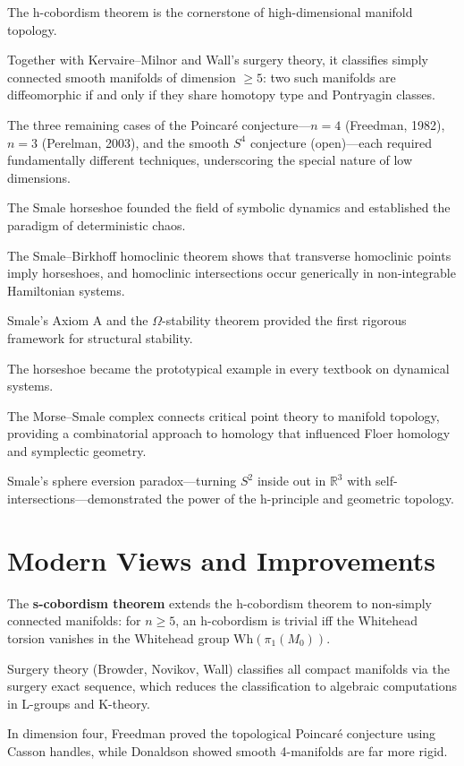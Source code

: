 The h-cobordism theorem is the cornerstone of high-dimensional manifold topology.

Together with Kervaire--Milnor and Wall's surgery theory, it classifies simply connected smooth manifolds of dimension $\geq 5$: two such manifolds are diffeomorphic if and only if they share homotopy type and Pontryagin classes.

The three remaining cases of the Poincaré conjecture---$n = 4$ (Freedman, 1982), $n = 3$ (Perelman, 2003), and the smooth $S^4$ conjecture (open)---each required fundamentally different techniques, underscoring the special nature of low dimensions.

The Smale horseshoe founded the field of symbolic dynamics and established the paradigm of deterministic chaos.

The Smale--Birkhoff homoclinic theorem shows that transverse homoclinic points imply horseshoes, and homoclinic intersections occur generically in non-integrable Hamiltonian systems.

Smale's Axiom A and the $\Omega$-stability theorem provided the first rigorous framework for structural stability.

The horseshoe became the prototypical example in every textbook on dynamical systems.

The Morse--Smale complex connects critical point theory to manifold topology, providing a combinatorial approach to homology that influenced Floer homology and symplectic geometry.

Smale's sphere eversion paradox---turning $S^2$ inside out in $\mathbb{R}^3$ with self-intersections---demonstrated the power of the h-principle and geometric topology.

\section{Modern Views and Improvements}

The \textbf{s-cobordism theorem} extends the h-cobordism theorem to non-simply connected manifolds: for $n \geq 5$, an h-cobordism is trivial iff the Whitehead torsion vanishes in the Whitehead group $\text{Wh}(\pi_1(M_0))$.

Surgery theory (Browder, Novikov, Wall) classifies all compact manifolds via the surgery exact sequence, which reduces the classification to algebraic computations in L-groups and K-theory.

In dimension four, Freedman proved the topological Poincaré conjecture using Casson handles, while Donaldson showed smooth 4-manifolds are far more rigid.

